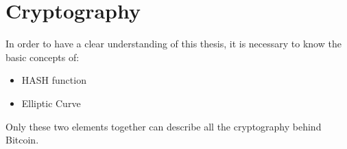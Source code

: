
\chapter{Cryptography} %

\label{EC} %


\newcommand{\keyword}[1]{\textbf{#1}}
\newcommand{\tabhead}[1]{\textbf{#1}}
\newcommand{\code}[1]{\texttt{#1}}
\newcommand{\file}[1]{\texttt{\bfseries#1}}
\newcommand{\option}[1]{\texttt{\itshape#1}}


In order to have a clear understanding of this thesis, it is necessary to know the basic concepts of:
\begin{itemize}[label=$\checkmark$]
	\item HASH function
	\item Elliptic Curve
\end{itemize}
Only these two elements together can describe all the cryptography behind Bitcoin.


